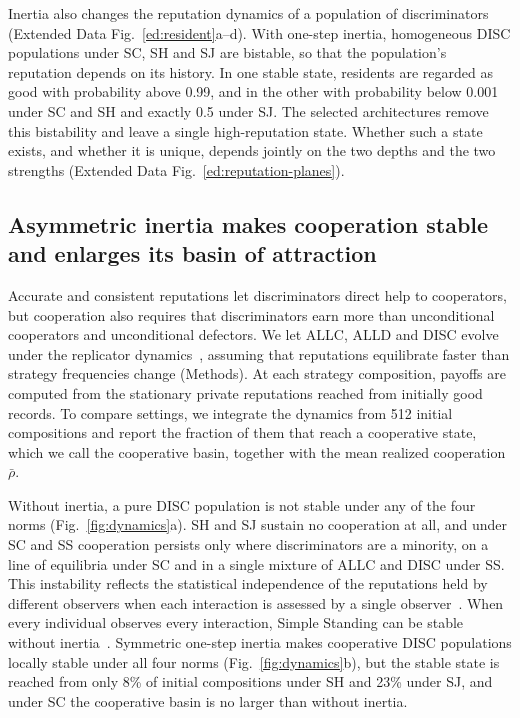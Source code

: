\documentclass[10pt]{wlscirep}
\theoremstyle{plain}
\theoremstyle{remark}
\begin{document}
Inertia also changes the reputation dynamics of a population of discriminators (Extended Data Fig.~\ref{ed:resident}a--d). With one-step inertia, homogeneous DISC populations under SC, SH and SJ are bistable, so that the population's reputation depends on its history. In one stable state, residents are regarded as good with probability above 0.99, and in the other with probability below 0.001 under SC and SH and exactly 0.5 under SJ. The selected architectures remove this bistability and leave a single high-reputation state. Whether such a state exists, and whether it is unique, depends jointly on the two depths and the two strengths (Extended Data Fig.~\ref{ed:reputation-planes}).

\subsection*{Asymmetric inertia makes cooperation stable and enlarges its basin of attraction}

Accurate and consistent reputations let discriminators direct help to cooperators, but cooperation also requires that discriminators earn more than unconditional cooperators and unconditional defectors. We let ALLC, ALLD and DISC evolve under the replicator dynamics~\cite{hofbauer1998}, assuming that reputations equilibrate faster than strategy frequencies change (Methods). At each strategy composition, payoffs are computed from the stationary private reputations reached from initially good records. To compare settings, we integrate the dynamics from 512 initial compositions and report the fraction of them that reach a cooperative state, which we call the cooperative basin, together with the mean realized cooperation $\bar\rho$.

Without inertia, a pure DISC population is not stable under any of the four norms (Fig.~\ref{fig:dynamics}a). SH and SJ sustain no cooperation at all, and under SC and SS cooperation persists only where discriminators are a minority, on a line of equilibria under SC and in a single mixture of ALLC and DISC under SS. This instability reflects the statistical independence of the reputations held by different observers when each interaction is assessed by a single observer~\cite{murase2024synchronization}. When every individual observes every interaction, Simple Standing can be stable without inertia~\cite{fujimoto2023}. Symmetric one-step inertia makes cooperative DISC populations locally stable under all four norms (Fig.~\ref{fig:dynamics}b), but the stable state is reached from only 8\% of initial compositions under SH and 23\% under SJ, and under SC the cooperative basin is no larger than without inertia.
\end{document}
